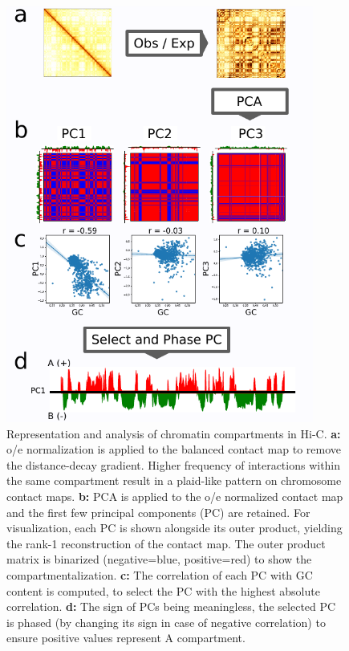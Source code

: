 \begin{figure}[h!]
    \centering
    \includegraphics[width=0.90\textwidth]{Parts/Part01/gfx/hic_pca_compartments.pdf}
    \caption[Representation and analysis of chromatin compartments in Hi-C.]{Representation and analysis of chromatin compartments in Hi-C. \textbf{a:} \acrfull{o/e} normalization is applied to the balanced contact map to remove the distance-decay gradient. Higher frequency of interactions within the same compartment result in a plaid-like pattern on chromosome contact maps. \textbf{b:} PCA is applied to the \acrshort{o/e} normalized contact map and the first few principal components (PC) are retained. For visualization, each PC is shown alongside its outer product, yielding the rank-1 reconstruction of the contact map. The outer product matrix is binarized (negative=blue, positive=red) to show the compartmentalization. \textbf{c:} The correlation of each PC with GC content is computed, to select the PC with the highest absolute correlation. \textbf{d:} The sign of PCs being meaningless, the selected PC is phased (by changing its sign in case of negative correlation) to ensure positive values represent A compartment.}
    \label{fig:01-02:compartments}
\end{figure}

